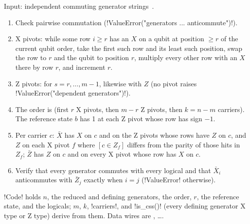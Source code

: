 \begin{algorithm}\label{alg:bench-standard}
Input: independent commuting generator strings~\cite{gottesman1998heisenberg}.
\begin{enumerate}
\item Check pairwise commutation (\py!ValueError("generators ... anticommute")!).
\item X pivots: while some row $i\ge r$ has an $X$ on a qubit at position $\ge r$ of the current
  qubit order, take the first such row and its least such position, swap the row to $r$ and the
  qubit to position $r$, multiply every other row with an $X$ there by row $r$, and increment
  $r$.
\item Z pivots: for $s = r,\dots,m-1$, likewise with $Z$ (no pivot raises
  \py!ValueError("dependent generators")!).
\item The order is (first $r$ X pivots, then $m-r$ Z pivots, then $k=n-m$ carriers). The
  reference state $b$ has 1 at each Z pivot whose row has sign $-1$.
\item Per carrier $c$: $\bar X$ has $X$ on $c$ and on the Z pivots whose rows have $Z$ on $c$,
  and $Z$ on each X pivot $f$ where $[c\in Z_f]$ differs from the parity of those hits in
  $Z_f$; $\bar Z$ has $Z$ on $c$ and on every X pivot whose row has $X$ on $c$.
\item Verify that every generator commutes with every logical and that $\bar X_i$ anticommutes
  with $\bar Z_j$ exactly when $i=j$ (\py!ValueError! otherwise).
\end{enumerate}
\end{algorithm}

\py!Code! holds $n$, the reduced and defining generators, the order, $r$, the reference state,
and the logicals; $m$, $k$, \py!carriers!, and \py!is_css()! (every defining generator X type or
Z type) derive from them. Data wires are , \dots.

